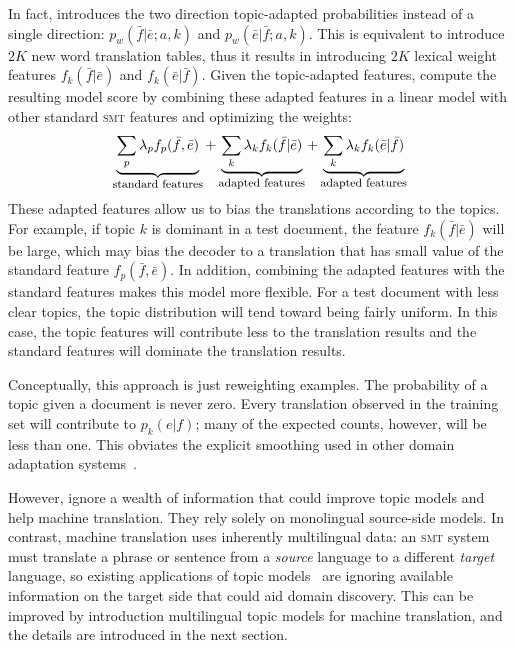 In fact, \citet{Eidelman-12} introduces the two direction topic-adapted probabilities instead of a single direction: $p_w(\bar{f} | \bar{e};a, k)$ and $p_w(\bar{e} | \bar{f};a, k)$. This is equivalent to introduce $2K$ new word translation tables, thus it results in introducing $2K$ lexical weight features $f_{k}(\bar{f}|\bar{e})$ and $f_{k}(\bar{e}|\bar{f})$. Given the topic-adapted features, \citet{Eidelman-12} compute the resulting model score by combining these adapted features in a linear model with other standard \textsc{smt} features and optimizing the weights:
\begin{align}
\explain{standard features}{\sum_p \lambda_p f_p(\bar{f},\bar{e})} + \explain{adapted features}{\sum_k \lambda_k f_k(\bar{f} | \bar{e})} + \explain{adapted features}{\sum_k \lambda_k f_k(\bar{e} | \bar{f})}
\end{align}
These adapted features allow us to bias the translations according to the topics. For example, if topic $k$ is dominant in a test document, the feature $f_k(\bar{f} | \bar{e})$ will be large, which may bias the decoder to a translation that has small value of the standard feature $f_p(\bar{f}, \bar{e})$. In addition, combining the adapted features with the standard features makes this model more flexible. For a test document with less clear topics, the topic distribution will tend toward being fairly uniform. In this case, the topic features will contribute less to the translation results and the standard features will dominate the translation results.

Conceptually, this approach is just reweighting examples.  The probability of a topic given a document is never zero.  Every translation observed in the training set will contribute to $p_{k}(e|f)$; many of the expected counts, however, will be less than one.  This obviates the explicit smoothing used in other domain adaptation systems~\citep{chiang-11}. 

However, \citet{Eidelman-12} ignore a wealth of information that could improve topic models and help machine translation. They rely solely on monolingual source-side models. In contrast, machine translation uses inherently multilingual data: an \textsc{smt} system must translate a phrase or sentence from a \emph{source} language to a different \emph{target} language, so existing applications of topic models~\citep{Eidelman-12} are ignoring available information on the target side that could aid domain discovery. This can be improved by introduction multilingual topic models for machine translation, and the details are introduced in the next section.

